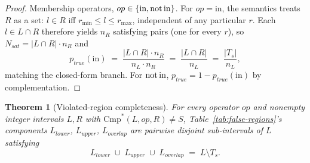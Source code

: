 \documentclass[pdflatex,sn-basic]{sn-jnl}%
\theoremstyle{thmstyleone}%
\newtheorem{theorem}{Theorem}%
\theoremstyle{thmstyletwo}%
\theoremstyle{thmstylethree}%
\begin{document}
\begin{proof}
Membership operators, $op \in \{\text{in}, \text{not\,in}\}$.
For $op = \text{in}$, the semantics treats $R$ as a set: $l \in R$ iff $r_{\min} \leq l \leq r_{\max}$, independent of any particular $r$. Each $l \in L \cap R$ therefore yields $n_R$ satisfying pairs (one for every $r$), so $N_{\mathit{sat}} = |L \cap R| \cdot n_R$ and
\[
p_{\mathit{true}}(\text{in}) \;=\; \frac{|L \cap R| \cdot n_R}{n_L \cdot n_R} \;=\; \frac{|L \cap R|}{n_L} \;=\; \frac{|T_s|}{n_L},
\]
matching the closed-form branch.
For $\text{not\,in}$, $p_{\mathit{true}} = 1 - p_{\mathit{true}}(\text{in})$ by complementation.
\end{proof}

\begin{theorem}[Violated-region completeness]\label{thm:region-complete}
For every operator $op$ and nonempty integer intervals $L, R$ with $\text{Cmp}^*(L, op, R) \neq S$, Table~\ref{tab:false-regions}'s components $L_{\mathit{lower}}$, $L_{\mathit{upper}}$, $L_{\mathit{overlap}}$ are pairwise disjoint sub-intervals of $L$ satisfying
\[
L_{\mathit{lower}} \;\cup\; L_{\mathit{upper}} \;\cup\; L_{\mathit{overlap}} \;=\; L \setminus T_s.
\]
\end{theorem}
\end{document}
